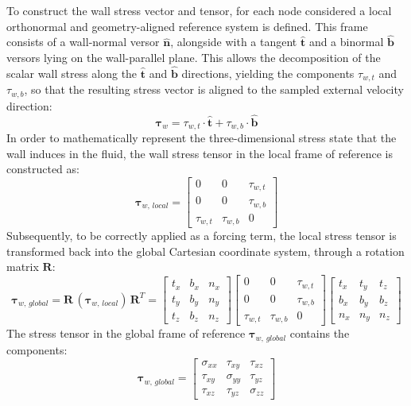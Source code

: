 \documentclass[12pt, a4paper, twoside, openright]{book}
\begin{document}
To construct the wall stress vector and tensor, for each node considered a local orthonormal and geometry-aligned reference system is defined. This frame consists of a wall-normal versor $\bm{\hat{n}}$, alongside with a tangent $\bm{\hat{t}}$ and a binormal $\bm{\hat{b}}$ versors lying on the wall-parallel plane. This allows the decomposition of the scalar wall stress along the $\bm{\hat{t}}$ and $\bm{\hat{b}}$ directions, yielding the components $\tau_{w,t}$ and $\tau_{w,b}$, so that the resulting stress vector is aligned to the sampled external velocity direction:
\begin{equation}
	\bm{\tau}_w = \tau_{w,t} \cdot \bm{\hat{t}} + \tau_{w,b} \cdot \bm{\hat{b}}
\end{equation}
In order to mathematically represent the three-dimensional stress state that the wall induces in the fluid, the wall stress tensor in the local frame of reference is constructed as:
\begin{equation}
	\bm{\tau}_{w, \, local} = \begin{bmatrix} 0 & 0 & \tau_{w,t} \\ 0 & 0 & \tau_{w,b} \\ \tau_{w,t} & \tau_{w,b} & 0 \end{bmatrix}
\end{equation}
Subsequently, to be correctly applied as a forcing term, the local stress tensor is transformed back into the global Cartesian coordinate system, through a rotation matrix $\bm{R}$:
\begin{equation}
	\bm{\tau}_{w, \, global} = \mathbf{R} \, (\bm{\tau}_{w, \, local}) \, \mathbf{R}^T = \begin{bmatrix} t_x & b_x & n_x \\ t_y & b_y & n_y \\ t_z & b_z & n_z \end{bmatrix} \begin{bmatrix} 0 & 0 & \tau_{w,t} \\ 0 & 0 & \tau_{w,b} \\ \tau_{w,t} & \tau_{w,b} & 0 \end{bmatrix} \begin{bmatrix} t_x & t_y & t_z \\ b_x & b_y & b_z \\ n_x & n_y & n_z \end{bmatrix}
\end{equation}
The stress tensor in the global frame of reference $\bm{\tau}_{w, \, global}$ contains the components:
\begin{equation}
	\bm{\tau}_{w, \, global} = 
	\begin{bmatrix}
		\sigma_{xx} & \tau_{xy} & \tau_{xz} \\
		\tau_{xy} & \sigma_{yy} & \tau_{yz} \\
		\tau_{xz} & \tau_{yz} & \sigma_{zz}
	\end{bmatrix}
\end{equation}
\end{document}
